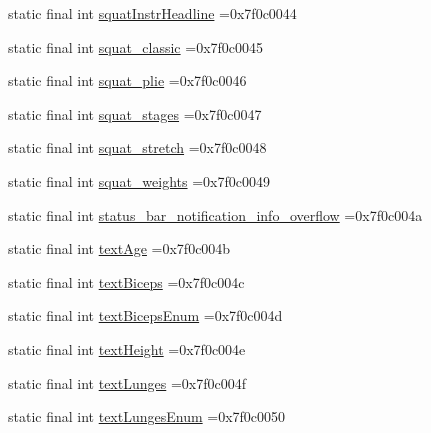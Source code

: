 \begin{DoxyCompactItemize}
\item 
static final int \mbox{\hyperlink{classcom_1_1example_1_1trainawearapplication_1_1_r_1_1string_a59bf3289f3762d505af6917df0dc34f4}{squat\+Instr\+Headline}} =0x7f0c0044
\item 
static final int \mbox{\hyperlink{classcom_1_1example_1_1trainawearapplication_1_1_r_1_1string_a7f7d9e179127bfdaacf0366ca40d3bcb}{squat\+\_\+classic}} =0x7f0c0045
\item 
static final int \mbox{\hyperlink{classcom_1_1example_1_1trainawearapplication_1_1_r_1_1string_a865b8aded5b3d28508c5f29c4279e58a}{squat\+\_\+plie}} =0x7f0c0046
\item 
static final int \mbox{\hyperlink{classcom_1_1example_1_1trainawearapplication_1_1_r_1_1string_a822ae997631a7b320b36b9bd6cceec94}{squat\+\_\+stages}} =0x7f0c0047
\item 
static final int \mbox{\hyperlink{classcom_1_1example_1_1trainawearapplication_1_1_r_1_1string_a0ea5d2f0e343f3b72464963548de72fc}{squat\+\_\+stretch}} =0x7f0c0048
\item 
static final int \mbox{\hyperlink{classcom_1_1example_1_1trainawearapplication_1_1_r_1_1string_a7af3452c07fb1e20e4590d4206a62d96}{squat\+\_\+weights}} =0x7f0c0049
\item 
static final int \mbox{\hyperlink{classcom_1_1example_1_1trainawearapplication_1_1_r_1_1string_a90fa5ef886df0f6f049d271e54b16f4e}{status\+\_\+bar\+\_\+notification\+\_\+info\+\_\+overflow}} =0x7f0c004a
\item 
static final int \mbox{\hyperlink{classcom_1_1example_1_1trainawearapplication_1_1_r_1_1string_ab63bc5b8bc7940b853f938f3558d52af}{text\+Age}} =0x7f0c004b
\item 
static final int \mbox{\hyperlink{classcom_1_1example_1_1trainawearapplication_1_1_r_1_1string_a8857cf81014403f86aa6d2f6fca1b209}{text\+Biceps}} =0x7f0c004c
\item 
static final int \mbox{\hyperlink{classcom_1_1example_1_1trainawearapplication_1_1_r_1_1string_a2b91ba6ca1399cb31de56afc1c2105ef}{text\+Biceps\+Enum}} =0x7f0c004d
\item 
static final int \mbox{\hyperlink{classcom_1_1example_1_1trainawearapplication_1_1_r_1_1string_a49721e38b5f488b97e1dd7870852de69}{text\+Height}} =0x7f0c004e
\item 
static final int \mbox{\hyperlink{classcom_1_1example_1_1trainawearapplication_1_1_r_1_1string_a043d982634ca501e35babf7874653260}{text\+Lunges}} =0x7f0c004f
\item 
static final int \mbox{\hyperlink{classcom_1_1example_1_1trainawearapplication_1_1_r_1_1string_a8116beac4cb6e26d4b20ae2bb864cafb}{text\+Lunges\+Enum}} =0x7f0c0050

\end{DoxyCompactItemize}
